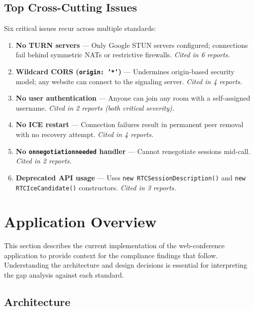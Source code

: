 \documentclass[11pt,letterpaper]{article}
\begin{document}
\subsection{Top Cross-Cutting Issues}

Six critical issues recur across multiple standards:

\begin{enumerate}[leftmargin=2em]
    \item \textbf{No TURN servers} --- Only Google STUN servers configured; connections fail behind symmetric NATs or restrictive firewalls. \textit{Cited in 6 reports.}
    \item \textbf{Wildcard CORS (\texttt{origin: '*'})} --- Undermines origin-based security model; any website can connect to the signaling server. \textit{Cited in 4 reports.}
    \item \textbf{No user authentication} --- Anyone can join any room with a self-assigned username. \textit{Cited in 2 reports (both critical severity).}
    \item \textbf{No ICE restart} --- Connection failures result in permanent peer removal with no recovery attempt. \textit{Cited in 4 reports.}
    \item \textbf{No \texttt{onnegotiationneeded} handler} --- Cannot renegotiate sessions mid-call. \textit{Cited in 2 reports.}
    \item \textbf{Deprecated API usage} --- Uses \texttt{new RTCSessionDescription()} and \texttt{new RTCIceCandidate()} constructors. \textit{Cited in 3 reports.}
\end{enumerate}

\newpage

\section{Application Overview}

This section describes the current implementation of the web-conference application to provide context for the compliance findings that follow. Understanding the architecture and design decisions is essential for interpreting the gap analysis against each standard.

\subsection{Architecture}
\end{document}
